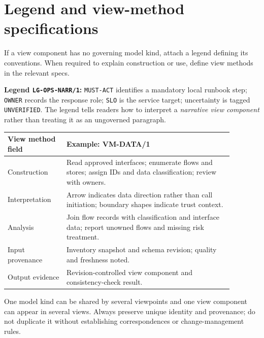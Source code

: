 \documentclass[11pt,letterpaper]{article}
\begin{document}
\section{Legend and view-method specifications}
\begin{Requirement}\FlagReq{} If a view component has no governing model kind, attach a legend defining its conventions. When required to explain construction or use, define view methods in the relevant specs. \end{Requirement}
\begin{Worked}\textbf{Legend \texttt{LG-OPS-NARR/1}:} \texttt{MUST-ACT} identifies a mandatory local runbook step; \texttt{OWNER} records the response role; \texttt{SLO} is the service target; uncertainty is tagged \texttt{UNVERIFIED}. The legend tells readers how to interpret a \emph{narrative view component} rather than treating it as an ungoverned paragraph.\end{Worked}
\begin{longtable}{p{0.23\linewidth}p{0.65\linewidth}}\toprule\textbf{View method field}&\textbf{Example: VM-DATA/1}\\\midrule\endhead
Construction&Read approved interfaces; enumerate flows and stores; assign IDs and data classification; review with owners.\\
Interpretation&Arrow indicates data direction rather than call initiation; boundary shapes indicate trust context.\\
Analysis&Join flow records with classification and interface data; report unowned flows and missing risk treatment.\\
Input provenance&Inventory snapshot and schema revision; quality and freshness noted.\\
Output evidence&Revision-controlled view component and consistency-check result.\\\bottomrule\end{longtable}
\begin{Guidance}One model kind can be shared by several viewpoints and one view component can appear in several views. Always preserve unique identity and provenance; do not duplicate it without establishing correspondences or change-management rules.\end{Guidance}
\end{document}
